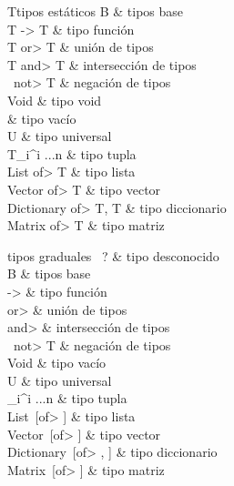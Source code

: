 \hspace*{-2cm}
\begin{grammar}{T}{tipos estáticos}
B                            & tipos base \\ %
T -> T                       & tipo función \\
T \<or> T                    & unión de tipos \\
T \<and> T                   & intersección de tipos \\
\ \<not> T                   & negación de tipos \\
Void                         & tipo void \\
                   & tipo vacío \\
U                            & tipo universal \\
{T_i}^{i ...n}          & tipo tupla \\
List \<of> T                 & tipo lista \\
Vector \<of> T               & tipo vector \\
Dictionary \<of> T, T        & tipo diccionario \\
Matrix \<of> T               & tipo matriz \\
\end{grammar}

\hspace*{-2cm}
\begin{grammar}{\tau}{tipos graduales}
\ ?                            & tipo desconocido \\
B                            & tipos base \\ %
\tau -> \tau                 & tipo función \\
\tau \<or> \tau              & unión de tipos \\
\tau \<and> \tau             & intersección de tipos \\
\ \<not> T                     & negación de tipos \\
Void                         & tipo vacío \\
U                            & tipo universal \\
{\tau_i}^{i ...n}       & tipo tupla \\
List\ [\<of> \tau]           & tipo lista \\
Vector\ [\<of> \tau]         & tipo vector \\
Dictionary\ [\<of> \tau, \tau]      & tipo diccionario \\
Matrix\ [\<of> \tau]         & tipo matriz \\
\end{grammar}


